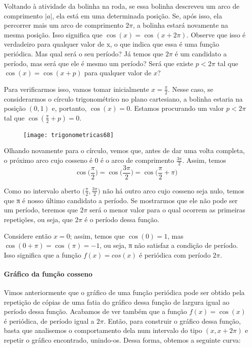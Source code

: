 Voltando à atividade da bolinha na roda, se essa bolinha descreveu um arco de comprimento $|a|$, ela está em uma determinada posição. Se, após isso, ela percorrer mais um arco de comprimento $2\pi$, a bolinha estará novamente na mesma posição. Isso significa que $\cos(x)=\cos(x+2\pi)$. Observe que isso é verdadeiro para qualquer valor de x, o que indica que essa é uma função periódica. Mas qual será o seu período? Já temos que $2\pi$ é um candidato a período, mas será que ele é mesmo um período? Será que existe $p<2\pi$ tal que $\cos(x)=\cos(x+p)$ para qualquer valor de $x$?

Para verificarmos isso, vamos tomar inicialmente $x=\frac{\pi}{2}$. Nesse caso, se considerarmos o círculo trigonométrico no plano cartesiano, a bolinha estaria na posição $(0,1)$ e, portanto, $\cos(x)=0$. Estamos procurando um valor $p<2\pi$ tal que $\cos(\frac{\pi}{2}+p)=0$.

\begin{figure}[H]
\centering

\texttt{[image: trigonometricas68]}
\end{figure}

Olhando novamente para o círculo, vemos que, antes de dar uma volta completa, o próximo arco cujo cosseno é $0$ é o arco de comprimento $\frac{3\pi}{2}$. Assim, temos
\begin{equation*}
\cos\bigg(\frac{\pi}{2}\bigg)=\cos\bigg(\frac{3\pi}{2}\bigg)=\cos\bigg(\frac{\pi}{2}+\pi\bigg)  
\end{equation*}

Como no intervalo aberto $\big(\frac{\pi}{2},\frac{3\pi}{2}\big)$ não há outro arco cujo cosseno seja nulo, temos que π é nosso último candidato a período. Se mostrarmos que ele não pode ser um período, teremos que $2\pi$ será o menor valor para o qual ocorrem as primeiras repetições, ou seja, que $2\pi$ é o período dessa função.

Considere então $x=0$; assim, temos que $\cos(0)=1$, mas $\cos(0+\pi)=\cos(\pi)=-1$, ou seja, π não satisfaz a condição de período. Isso significa que a função $f(x)=cos(x)$ é periódica com período $2\pi$.

\paragraph{Gráfico da função cosseno}

Vimos anteriormente que o gráfico de uma função periódica pode ser obtido pela repetição de cópias de uma fatia do gráfico dessa função de largura igual ao período dessa função. Acabamos de ver também que a função $f(x)=\cos(x)$ é periódica, de período igual a $2\pi$. Então, para construir o gráfico dessa função, basta que analisemos o comportamento dela num intervalo do tipo $(x,x+2\pi)$ e repetir o gráfico encontrado, unindo-os. Dessa forma, obtemos a seguinte curva:

